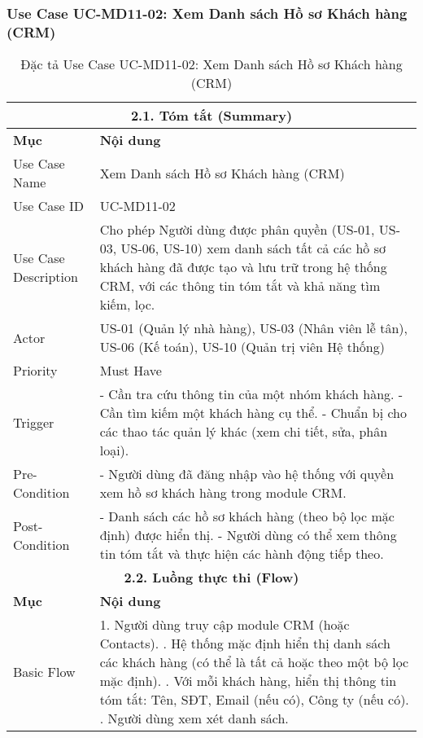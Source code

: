 \subsubsection{Use Case UC-MD11-02: Xem Danh sách Hồ sơ Khách hàng (CRM)}
\begin{longtable}{|m{4cm}|p{11cm}|}
\caption{Đặc tả Use Case UC-MD11-02: Xem Danh sách Hồ sơ Khách hàng (CRM)} \label{tab:uc_md11_02_view_customer_list_crm} \\
\hline
\multicolumn{2}{|c|}{\textbf{2.1. Tóm tắt (Summary)}} \\
\hline
\textbf{Mục} & \textbf{Nội dung} \\
\hline
\endhead
\midrule
\endfoot
\bottomrule
\endlastfoot
Use Case Name & Xem Danh sách Hồ sơ Khách hàng (CRM) \\
\hline
Use Case ID & UC-MD11-02 \\
\hline
Use Case Description & Cho phép Người dùng được phân quyền (US-01, US-03, US-06, US-10) xem danh sách tất cả các hồ sơ khách hàng đã được tạo và lưu trữ trong hệ thống CRM, với các thông tin tóm tắt và khả năng tìm kiếm, lọc. \\
\hline
Actor & US-01 (Quản lý nhà hàng), US-03 (Nhân viên lễ tân), US-06 (Kế toán), US-10 (Quản trị viên Hệ thống) \\
\hline
Priority & Must Have \\
\hline
Trigger & - Cần tra cứu thông tin của một nhóm khách hàng. \newline - Cần tìm kiếm một khách hàng cụ thể. \newline - Chuẩn bị cho các thao tác quản lý khác (xem chi tiết, sửa, phân loại). \\
\hline
Pre-Condition & - Người dùng đã đăng nhập vào hệ thống với quyền xem hồ sơ khách hàng trong module CRM. \\
\hline
Post-Condition & - Danh sách các hồ sơ khách hàng (theo bộ lọc mặc định) được hiển thị. \newline - Người dùng có thể xem thông tin tóm tắt và thực hiện các hành động tiếp theo. \\
\hline
\multicolumn{2}{|c|}{\textbf{2.2. Luồng thực thi (Flow)}} \\
\hline
\textbf{Mục} & \textbf{Nội dung} \\
\hline
Basic Flow & 1. Người dùng truy cập module CRM (hoặc Contacts). \newline 2. Hệ thống mặc định hiển thị danh sách các khách hàng (có thể là tất cả hoặc theo một bộ lọc mặc định). \newline 3. Với mỗi khách hàng, hiển thị thông tin tóm tắt: Tên, SĐT, Email (nếu có), Công ty (nếu có). \newline 4. Người dùng xem xét danh sách. \\

\end{longtable}

